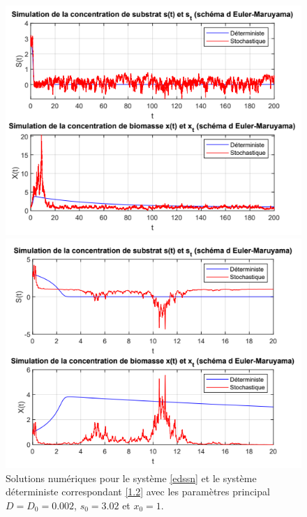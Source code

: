 \documentclass[12pt,a4paper]{report}%
\begin{document}
\begin{figure}[h]
	\centering
	\begin{minipage}{0.48\textwidth}
		\centering
		\includegraphics[width=\textwidth]{e3.png}
		\caption*{ $\sigma = 0.5$.}
	\end{minipage}
	\hfill
	\begin{minipage}{0.48\textwidth}
		\centering
		\includegraphics[width=\textwidth]{e4.png}
		\caption*{ $\sigma = 1.5$.}
	\end{minipage}
	\caption{Solutions numériques pour le système \eqref{edssn} et le système déterministe correspondant \eqref{1.2} avec les paramètres principal \(D= D_0 = 0.002 \), $s_0=3.02$ et $x_0=1$.}
   \label{fig:fgure1}
\end{figure}
\end{document}
